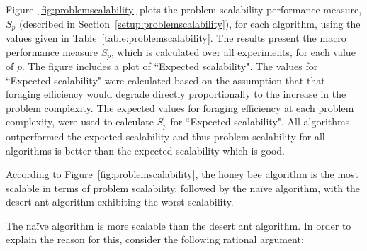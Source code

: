 Figure~\ref{fig:problemscalability} plots the problem scalability performance measure, $S_p$ (described in Section~\ref{setup:problemscalability}), for each algorithm, using the values given in Table~\ref{table:problemscalability}. The results present the macro performance measure $S_p$, which is calculated over all experiments, for each value of $p$. The figure includes a plot of ``Expected scalability". The values for ``Expected scalability" were calculated based on the assumption that  that foraging efficiency would degrade directly proportionally to the increase in the problem complexity. The expected values for foraging efficiency at each problem complexity, were used to calculate $S_p$ for ``Expected scalability". All algorithms outperformed the expected scalability and thus problem scalability for all algorithms is better than the expected scalability which is good. 

According to Figure~\ref{fig:problemscalability}, the honey bee algorithm is the most scalable in terms of problem scalability, followed by the na\"ive algorithm, with the desert ant algorithm exhibiting the worst scalability. %


The na\"ive algorithm is more scalable than the desert ant algorithm. In order to explain the reason for this, consider the following rational argument:

